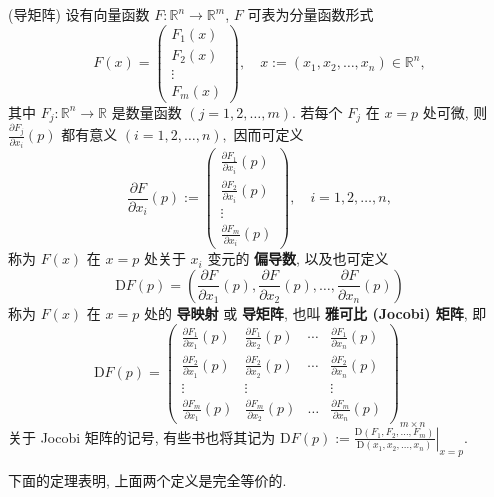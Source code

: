 \begin{definition}{(导矩阵)}
设有向量函数 $F:\mathbb{R}^{n}\rightarrow\mathbb{R}^{m}$, $F$ 可表为分量函数形式
$$
F(x)=\left(\begin{array}{c}
F_{1}(x)\\
F_{2}(x)\\
\vdots\\
F_{m}(x)
\end{array}\right),\quad x:=(x_{1},x_{2},\ldots,x_{n})\in\mathbb{R}^{n},
$$
其中 $F_{j}:\mathbb{R}^{n}\rightarrow\mathbb{R}$ 是数量函数 $(j=1,2,\ldots,m)$.
若每个 $F_{j}$ 在 $x=p$ 处可微, 则 ${\displaystyle \frac{\partial F_{j}}{\partial x_{i}}(p)}$
都有意义 $(i=1,2,\ldots,n),$ 因而可定义
$$
{\displaystyle \frac{\partial F}{\partial x_{i}}(p):=\left(\begin{array}{c}
\frac{\partial F_{1}}{\partial x_{i}}(p)\\
\frac{\partial F_{2}}{\partial x_{i}}(p)\\
\vdots\\
\frac{\partial F_{m}}{\partial x_{i}}(p)
\end{array}\right),\quad i=1,2,\ldots,n,}
$$
称为 $F(x)$ 在 $x=p$ 处关于 $x_{i}$ 变元的 \textbf{偏导数}, 以及也可定义
\[
\mathrm{D}F(p)=(\frac{\partial F}{\partial x_{1}}(p),\frac{\partial F}{\partial x_{2}}(p),\ldots,\frac{\partial F}{\partial x_{n}}(p))
\]
称为 $F(x)$ 在 $x=p$ 处的 \textbf{导映射} 或 \textbf{导矩阵}, 也叫 \textbf{雅可比 (Jocobi)
矩阵}, 即
$$
\mathrm{D}F(p)=\left(\begin{array}{cccc}
\frac{\partial F_{1}}{\partial x_{1}}(p) & \frac{\partial F_{1}}{\partial x_{2}}(p) & \cdots & \frac{\partial F_{1}}{\partial x_{n}}(p)\\
\frac{\partial F_{2}}{\partial x_{1}}(p) & \frac{\partial F_{2}}{\partial x_{2}}(p) & \cdots & \frac{\partial F_{2}}{\partial x_{n}}(p)\\
\vdots & \vdots &  & \vdots\\
\frac{\partial F_{m}}{\partial x_{1}}(p) & \frac{\partial F_{m}}{\partial x_{2}}(p) & \ldots & \frac{\partial F_{m}}{\partial x_{n}}(p)
\end{array}\right)_{m\times n}
$$
关于 Jocobi 矩阵的记号, 有些书也将其记为 $\mathrm{D}F(p):={\displaystyle \left.\frac{\mathrm{D}(F_{1},F_{2},\ldots,F_{m})}{\mathrm{D}(x_{1},x_{2},\ldots,x_{n})}\right|_{x=p}.}$
\end{definition}



下面的定理表明, 上面两个定义是完全等价的. 

